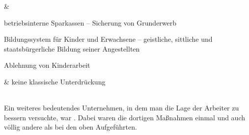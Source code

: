 \begin{supertabular*}{\textwidth}
\vspace{0.01pt}
& \begin{tablist}
\item betriebsinterne Sparkassen -- Sicherung von Grunderwerb
\item Bildungssystem für Kinder und Erwachsene -- geistliche,
sittliche und staatsbürgerliche Bildung seiner Angestellten
\item Ablehnung von Kinderarbeit
\end{tablist}
&\vspace{0.01pt} keine klassische Unterdrückung
\\
\end{supertabular*}

\ \\

Ein weiteres bedeutendes Unternehmen, in dem man die Lage der Arbeiter
zu bessern versuchte, war . Dabei waren die
dortigen Maßnahmen einmal und auch völlig andere als bei den oben
Aufgeführten.

\endinput
